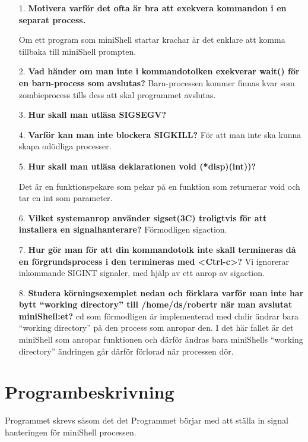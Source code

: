\documentclass[a4paper,10pt,titlepage]{article}
\begin{document}
\begin{enumerate}
	\item[1.] \textbf{\footnotesize Motivera varför det ofta är bra att exekvera kommandon i en separat process.}

    Om ett program som miniShell startar krachar är det enklare att komma
    tillbaka till miniShell prompten.

	\item[2.] \textbf{\footnotesize Vad händer om man inte i kommandotolken exekverar wait() för en barn-process som avslutas?}
	Barn-processen kommer finnas kvar som zombieprocess tills dess att skal
    programmet avslutas.

	\item[3.] \textbf{\footnotesize Hur skall man utläsa SIGSEGV?}

	\item[4.] \textbf{\footnotesize Varför kan man inte blockera SIGKILL?}
    För att man inte ska kunna skapa odödliga processer.

	\item[5.] \textbf{\footnotesize Hur skall man utläsa deklarationen void (*disp)(int))?}
	
    Det är en funktionspekare som pekar på en funktion som returnerar void och
    tar en int som parameter.

	\item[6.] \textbf{\footnotesize Vilket systemanrop använder sigset(3C) troligtvis för att installera en signalhanterare?}
	Förmodligen sigaction.

	\item[7.] \textbf{\footnotesize Hur gör man för att din kommandotolk inte skall termineras då en förgrundsprocess i den termineras med <Ctrl-c>?}
	Vi ignorerar inkommande SIGINT signaler, med hjälp av ett anrop av sigaction.

	\item[8.] \textbf{\footnotesize Studera körningsexemplet nedan och förklara varför man inte har bytt “working directory” till /home/ds/robertr när man avslutat miniShell:et?}
    cd som förmodligen är implementerad med chdir ändrar bara “working
    directory” på den process som anropar den. I det här fallet är det miniShell
    som anropar funktionen och därför ändras bara miniShells “working directory”
    ändringen går därför förlorad när processen dör.

\end{enumerate}

\newpage
\section{Programbeskrivning}
Programmet skrevs såsom det det
Programmet börjar med att ställa in signal hanteringen för miniShell processen.
\end{document}
